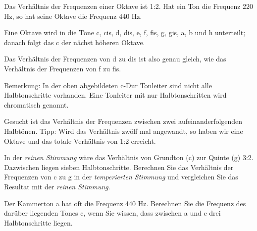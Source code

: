 Das Verhältnis der Frequenzen einer Oktave ist 1:2. Hat ein Ton \zB
die Frequenz 220 Hz, so hat seine Oktave die Frequenz 440 Hz.

Eine Oktave wird in die Töne c, cis, d, dis, e, f, fis, g, gis, a, b und h
unterteilt; danach folgt das c der nächst höheren Oktave.

Das Verhältnis der Frequenzen von d zu dis ist also genau gleich, wie
das Verhältnis der Frequenzen von f zu fis.

Bemerkung:  In der oben
abgebildeten c-Dur Tonleiter sind nicht alle Halbtonschritte
vorhanden. Eine Tonleiter mit nur Halbtonschritten wird chromatisch
genannt.

\begin{bbwAufgabenBlock}

\item Gesucht ist das Verhältnis der Frequenzen zwischen zwei aufeinanderfolgenden Halbtönen. Tipp: Wird
  das Verhältnis zwölf mal angewandt, so haben wir eine Oktave und das
  totale Verhältnis von 1:2 erreicht.


\item In der \textit{reinen Stimmung} wäre das Verhältnis von Grundton
  (c) zur Quinte (g) 3:2. Dazwischen liegen sieben
  Halbtonschritte. Berechnen Sie das Verhältnis der Frequenzen von c zu
  g in der \textit{temperierten Stimmung} und vergleichen Sie das
  Resultat mit der \textit{reinen Stimmung}.

  


\item Der Kammerton a hat oft die Frequenz 440 Hz. Berechnen Sie die
  Frequenz des darüber liegenden Tones c, wenn Sie wissen, dass
  zwischen a und c drei Halbtonschritte liegen.


    
\end{bbwAufgabenBlock}
\platzFuerBerechnungenBisEndeSeite{}



